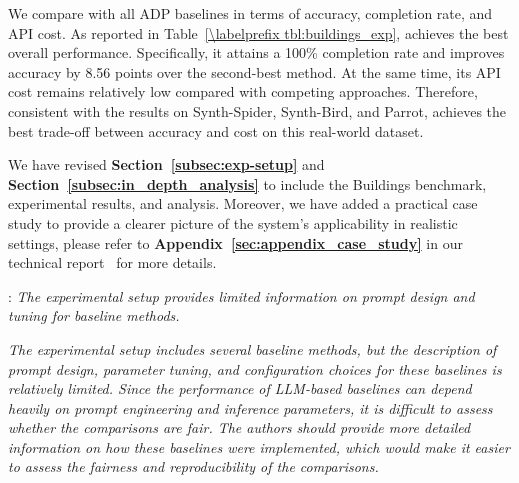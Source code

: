 We compare \sys with all ADP baselines in terms of accuracy, completion rate, and API cost. As reported in Table~\ref{\labelprefix tbl:buildings_exp}, \sys achieves the best overall performance. Specifically, it attains a 100\% completion rate and improves accuracy by 8.56 points over the second-best method. At the same time, its API cost remains relatively low compared with competing approaches. Therefore, consistent with the results on Synth-Spider, Synth-Bird, and Parrot, \sys achieves the best trade-off between accuracy and cost on this real-world dataset.

{We have revised \textbf{Section~\ref{subsec:exp-setup}} and \textbf{Section~\ref{subsec:in_depth_analysis}} to include the Buildings benchmark, experimental results, and analysis.} Moreover, we have added a practical case study to provide a clearer picture of the system’s applicability
in realistic settings, please refer to \textbf{Appendix~\ref{sec:appendix_case_study}} in our technical report~\cite{technical_report} for more details.



\begin{shaded}
{
: 
\emph{The experimental setup provides limited information on prompt design and tuning for baseline methods.
}

\emph{The experimental setup includes several baseline methods, but the description of prompt design, parameter tuning, and configuration choices for these baselines is relatively limited. Since the performance of LLM-based baselines can depend heavily on prompt engineering and inference parameters, it is difficult to assess whether the comparisons are fair. The authors should provide more detailed information on how these baselines were implemented, which would make it easier to assess the fairness and reproducibility of the comparisons.}
}
\end{shaded}

